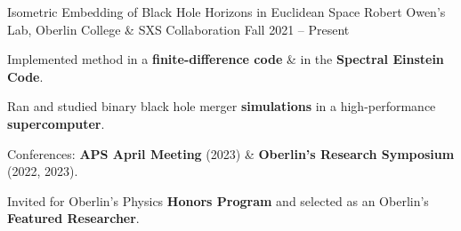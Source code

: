 \begin{entry}{Isometric Embedding of Black Hole Horizons in Euclidean Space}
	\entryItem
		{Robert Owen's Lab, Oberlin College \& SXS Collaboration}
		{Fall 2021 -- Present}

		\begin{items}
			\item Implemented method in a \textbf{finite-difference code} \hspace*{-0.1cm}\hspace*{-0.1cm} \& in the \textbf{Spectral Einstein Code}.
			\item Ran and studied binary black hole merger \textbf{simulations} in a high-performance \textbf{supercomputer}.
			\item Conferences: \textbf{APS April Meeting} (2023) \& \textbf{Oberlin's Research Symposium} (2022, 2023).
			\item Invited for Oberlin's Physics \textbf{Honors Program} and selected as an Oberlin's \textbf{Featured Researcher}.
		\end{items}
\end{entry}
